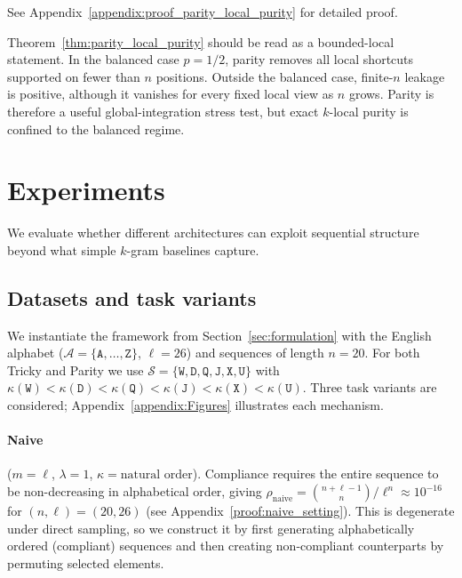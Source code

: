 \documentclass{article}
\theoremstyle{plain}
\theoremstyle{definition}
\theoremstyle{remark}
\begin{document}
See Appendix~\ref{appendix:proof_parity_local_purity} for detailed proof.

Theorem~\ref{thm:parity_local_purity} should be read as a bounded-local statement. In the balanced case $p=1/2$, parity removes all local shortcuts supported on fewer than $n$ positions. Outside the balanced case, finite-$n$
leakage is positive, although it vanishes for every fixed local view as $n$ grows. Parity is therefore a useful global-integration stress test, but exact $k$-local purity is confined to the balanced regime.

\section{Experiments}
\label{sec:experiments}

We evaluate whether different architectures can exploit sequential structure beyond what simple $k$-gram baselines capture.

\subsection{Datasets and task variants}
\label{sec:task_variants}
\label{subsec:datasets}

We instantiate the framework from Section~\ref{sec:formulation} with the English alphabet ($\mathcal{A} = \{\texttt{A}, \ldots, \texttt{Z}\}$, $\ell = 26$) and sequences of length $n = 20$. For both Tricky and Parity we use $\mathcal{S} = \{\texttt{W}, \texttt{D}, \texttt{Q}, \texttt{J}, \texttt{X}, \texttt{U}\}$ with $\kappa(\texttt{W}){<}\kappa(\texttt{D}){<}\kappa(\texttt{Q}){<}\kappa(\texttt{J}){<}\kappa(\texttt{X}){<}\kappa(\texttt{U})$. Three task variants are considered; Appendix~\ref{appendix:Figures} illustrates each mechanism.

\paragraph{Naive} ($m = \ell$, $\lambda = 1$, $\kappa = \text{natural order}$).
\label{paragraph:naive_setting}
Compliance requires the entire sequence to be non-decreasing in alphabetical order, giving $\rho_{\mathrm{naive}} = \binom{n+\ell-1}{n}/\ell^n \approx 10^{-16}$ for $(n,\ell)=(20,26)$ (see Appendix~\ref{proof:naive_setting}). This is degenerate under direct sampling, so we construct it by first generating alphabetically ordered (compliant) sequences and then creating non-compliant counterparts by permuting selected elements.
\end{document}

